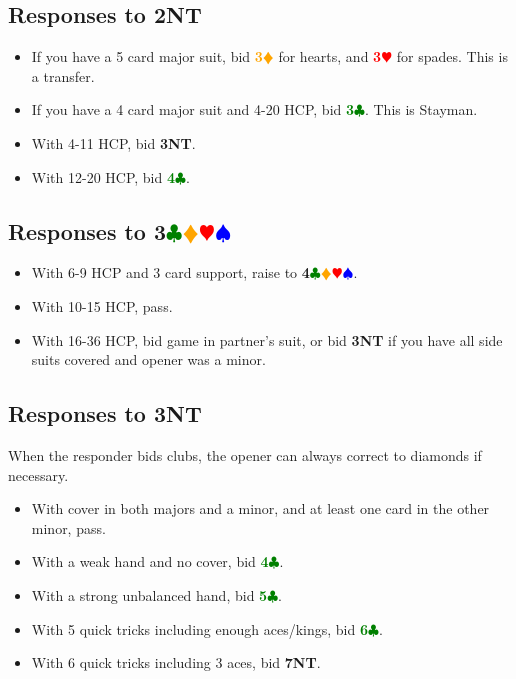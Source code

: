 \documentclass{article}
\newcommand{\Hs}{\textcolor{Red}{$\varheart$}}
\newcommand{\Ss}{\textcolor{Blue}{$\spadesuit$}}
\newcommand{\Ds}{\textcolor{Orange}{$\vardiamond$}}
\newcommand{\Cs}{\textcolor{Green}{$\clubsuit$}}
\newcommand{\NTs}{\textbf{\footnotesize{NT}}}
\renewcommand{\H}[1]{\textcolor{Red}{\textbf{#1}\Hs}}
\newcommand{\D}[1]{\textcolor{Orange}{\textbf{#1}\Ds}}
\newcommand{\C}[1]{\textcolor{Green}{\textbf{#1}\Cs}}
\newcommand{\NT}[1]{\textbf{#1\NTs}}
\newcommand{\suits}[1]{\textbf{#1}\Cs\Ds\Hs\Ss}
\begin{document}
\subsection{Responses to \NT{2}}

\begin{itemize}
\item If you have a 5 card major suit, bid \D{3} for hearts, and \H{3} for spades. This is a transfer.
\item If you have a 4 card major suit and 4-20 HCP, bid \C{3}. This is Stayman.
\item With 4-11 HCP, bid \NT{3}.
\item With 12-20 HCP, bid \C{4}.
\end{itemize}

\subsection{Responses to \suits{3}}

\begin{itemize}
\item With 6-9 HCP and 3 card support, raise to \suits{4}.
\item With 10-15 HCP, pass.
\item With 16-36 HCP, bid game in partner's suit, or bid \NT{3} if you have all side suits covered and opener was a minor.
\end{itemize}

\subsection{Responses to \NT{3}}

When the responder bids clubs, the opener can always correct to diamonds if necessary.
\begin{itemize}
\item With cover in both majors and a minor, and at least one card in the other minor, pass.
\item With a weak hand and no cover, bid \C{4}.
\item With a strong unbalanced hand, bid \C{5}.
\item With 5 quick tricks including enough aces/kings, bid \C{6}.
\item With 6 quick tricks including 3 aces, bid \NT{7}.
\end{itemize}
\end{document}
